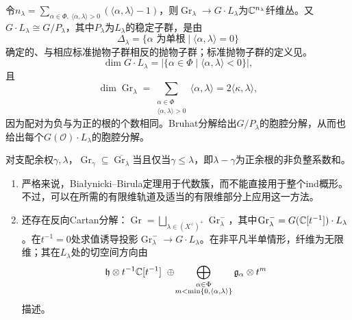 令$n_\lambda=\sum_{\alpha\in\Phi,\ \langle\alpha,\lambda\rangle>0}(\langle\alpha,\lambda\rangle-1)$，则$\operatorname{Gr}_\lambda\to G\cdot L_\lambda$为$\mathbb{C}^{n_\lambda}$纤维丛。又$G\cdot L_\lambda\cong G/P_\lambda$，其中$P_\lambda$为$L_\lambda$的稳定子群，是由
\[\Delta_\lambda=\{\alpha\text{ 为单根}\mid\langle\alpha,\lambda\rangle=0\}\]
确定的、与相应标准抛物子群相反的抛物子群；标准抛物子群的定义见。
\[\dim G\cdot L_\lambda=|\{\alpha\in\Phi\mid\langle\alpha,\lambda\rangle<0\}|,\]
且
\[\dim\operatorname{Gr}_\lambda=\sum_{\substack{\alpha\in\Phi\\\langle\alpha,\lambda\rangle>0}}\langle\alpha,\lambda\rangle=2\langle\kappa,\lambda\rangle,\]
因为配对为负与为正的根的个数相同。Bruhat分解给出$G/P_\lambda$的胞腔分解，从而也给出每个$G(\mathcal O)\cdot L_\lambda$的胞腔分解。
\begin{proposition}\label{L21S2O2}
对支配余权$\gamma,\lambda$，$\operatorname{Gr}_\gamma\subseteq\overline{\operatorname{Gr}_\lambda}$当且仅当$\gamma\le\lambda$，即$\lambda-\gamma$为正余根的非负整系数和。
\end{proposition}
\begin{note}[L21S2O3]
\begin{enumerate}[label=(\arabic*)]
\item 严格来说，Białynicki–Birula定理用于代数簇，而不能直接用于整个ind概形。不过，可以在所需的有限维轨道及适当的有限维部分上应用这一方法。
\item 还存在反向Cartan分解：$\operatorname{Gr}=\bigsqcup_{\lambda\in(X^\vee)^+}\operatorname{Gr}^-_\lambda$，其中$\operatorname{Gr}^-_\lambda=G(\mathbb{C}[t^{-1}])\cdot L_\lambda$。在$t^{-1}=0$处求值诱导投影$\operatorname{Gr}^-_\lambda\to G\cdot L_\lambda$。在非平凡半单情形，纤维为无限维；其在$L_\lambda$处的切空间方向由
\[\mathfrak h\otimes t^{-1}\C[t^{-1}]\ \oplus\!\bigoplus_{\substack{\alpha\in\Phi\\m<\min\{0,\langle\alpha,\lambda\rangle\}}}\g_\alpha\otimes t^m\]
描述。
\end{enumerate}
\end{note}
